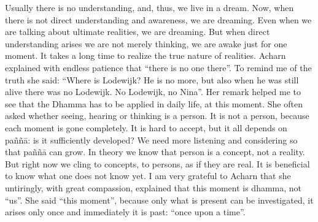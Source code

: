 Usually there is no understanding, and, thus, we live in a dream. Now,
when there is not direct understanding and awareness, we are dreaming.
Even when we are talking about ultimate realities, we are dreaming. But
when direct understanding arises we are not merely thinking, we are
awake just for one moment. It takes a long time to realize the true
nature of realities. Acharn explained with endless patience that ``there
is no one there''. To remind me of the truth she said: ``Where is
Lodewijk? He is no more, but also when he was still alive there was no
Lodewijk. No Lodewijk, no Nina''. Her remark helped me to see that the
Dhamma has to be applied in daily life, at this moment. She often asked
whether seeing, hearing or thinking is a person. It is not a person,
because each moment is gone completely. It is hard to accept, but it all
depends on paññā: is it sufficiently developed? We need more listening
and considering so that paññā can grow. In theory we know that person is
a concept, not a reality. But right now we cling to concepts, to
persons, as if they are real. It is beneficial to know what one does not
know yet. I am very grateful to Acharn that she untiringly, with great
compassion, explained that this moment is dhamma, not ``us''. She said
``this moment'', because only what is present can be investigated, it
arises only once and immediately it is past: ``once upon a time''.